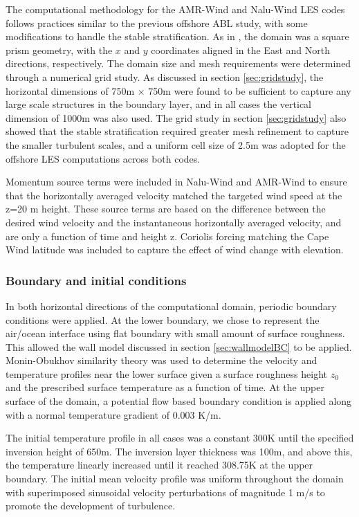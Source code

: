 The computational methodology for the AMR-Wind and Nalu-Wind LES codes
follows practices similar to the previous offshore ABL study, with
some modifications to handle the stable stratification.  As in
\cite{cheung2020large}, the domain was a square prism geometry, with
the $x$ and $y$ coordinates aligned in the East and North directions,
respectively.  The domain size and mesh requirements were determined
through a numerical grid study.  As discussed in section
\ref{sec:gridstudy}, the horizontal dimensions of 750m $\times$ 750m
were found to be sufficient to capture any large scale structures in
the boundary layer, and in all cases the vertical dimension of 1000m
was also used.  The grid study in section \ref{sec:gridstudy} also
showed that the stable stratification required greater mesh refinement
to capture the smaller turbulent scales, and a uniform cell size of
2.5m was adopted for the offshore LES computations across both codes.

Momentum source terms were included in Nalu-Wind and AMR-Wind to
ensure that the horizontally averaged velocity matched the targeted
wind speed at the z=20 m height.  These source terms are based on the
difference between the desired wind velocity and the instantaneous
horizontally averaged velocity, and are only a function of time and
height z.  Coriolis forcing matching the Cape Wind latitude was
included to capture the effect of wind change with elevation.

\subsubsection{Boundary and initial conditions}
In both horizontal directions of the computational domain, periodic
boundary conditions were applied.  At the lower boundary, we chose to
represent the air/ocean interface using flat boundary with small
amount of surface roughness.  This allowed the wall model discussed in
section \ref{sec:wallmodelBC} to be applied.  Monin-Obukhov similarity
theory was used to determine the velocity and temperature profiles
near the lower surface given a surface roughness height $z_0$ and the
prescribed surface temperature as a function of time.  At the upper
surface of the domain, a potential flow based boundary condition is
applied along with a normal temperature gradient of 0.003 K/m.

The initial temperature profile in all cases was a constant 300K until
the specified inversion height of 650m.  The inversion layer thickness
was 100m, and above this, the temperature linearly increased until it
reached 308.75K at the upper boundary.  The initial mean velocity
profile was uniform throughout the domain with superimposed sinusoidal
velocity perturbations of magnitude 1 m/s to promote the development
of turbulence.

